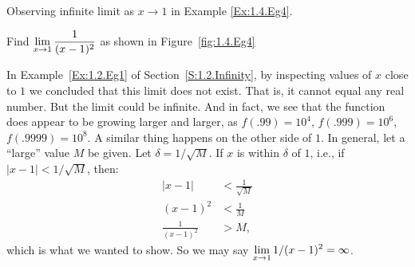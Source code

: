 \begin{marginfigure}[8cm]
\caption{Observing infinite limit as $x\to 1$ in Example \ref{Ex:1.4.Eg4}.}\label{fig:1.4.Eg4}
\end{marginfigure}

\begin{example} \label{Ex:1.4.Eg4}
Find $\displaystyle \lim_{x \to 1}\frac1{(x-1)^2}$ as shown in Figure~\ref{fig:1.4.Eg4}

\solution In Example~\ref{Ex:1.2.Eg1} of Section~\ref{S:1.2.Infinity}, by inspecting values of $x$ close to $1$ we concluded that this limit does not exist.  That is, it cannot equal any real number.  But the limit could be infinite.  And in fact, we see that the function does appear to be growing larger and larger, as $f(.99)=10^4$, $f(.999)=10^6$, $f(.9999)=10^8$.  A similar thing happens on the other side of $1$.  In general, let a ``large'' value $M$ be given. Let $\delta=1/\sqrt{M}$. If $x$ is within $\delta$ of $1$, i.e., if $|x-1|<1/\sqrt{M}$, then:
\begin{align*}
|x-1| &< \frac{1}{\sqrt{M}} \\
(x-1)^2 &< \frac{1}{M}\\
\frac{1}{(x-1)^2} &> M,
\end{align*}
which is what we wanted to show.  So we may say $\displaystyle \lim_{x \to 1}1/{(x-1)^2}=\infty$.
\end{example}